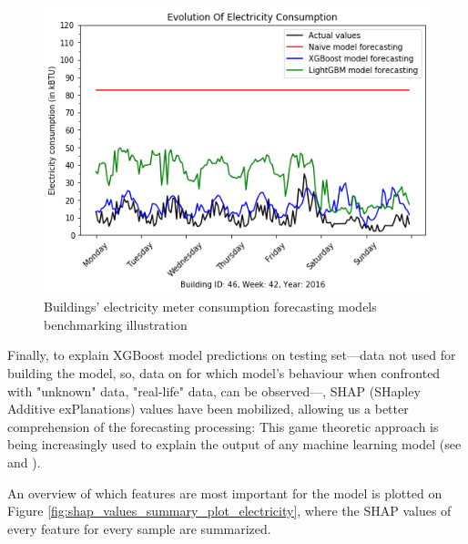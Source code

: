 \documentclass[twocolumn, switch]{article}
\begin{document}
\begin{figure}[H]
\centering
\includegraphics[scale=0.35]{../graphs/sample_electricity_consumption_comparison}
\caption{Buildings' electricity meter consumption forecasting models benchmarking illustration}
\label{fig:electricity_benchmarking_illustration}
\end{figure}

Finally, to explain XGBoost model predictions on testing set---data not used for building the model, so, data on for which model's behaviour when confronted with "unknown" data, "real-life" data, can be observed---, SHAP (SHapley Additive exPlanations) values have been mobilized, allowing us a better comprehension of the forecasting processing: This game theoretic approach is being increasingly used to explain the output of any machine learning model (see \cite{Lundberg_2017} and \cite{Lundberg_2020}).

An overview of which features are most important for the model is plotted on Figure \ref{fig:shap_values_summary_plot_electricity}, where the SHAP values of every feature for every sample are summarized.
\end{document}
